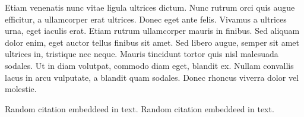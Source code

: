 Etiam venenatis nunc vitae ligula ultrices dictum. Nunc rutrum orci quis augue efficitur, a ullamcorper erat ultrices. Donec eget ante felis. Vivamus a ultrices urna, eget iaculis erat. Etiam rutrum ullamcorper mauris in finibus. Sed aliquam dolor enim, eget auctor tellus finibus sit amet. Sed libero augue, semper sit amet ultrices in, tristique nec neque. Mauris tincidunt tortor quis nisl malesuada sodales. Ut in diam volutpat, commodo diam eget, blandit ex. Nullam convallis lacus in arcu vulputate, a blandit quam sodales. Donec rhoncus viverra dolor vel molestie.

Random citation \cite{DUMMY:1} embeddeed in text.
Random citation \cite{DUMMY:2} embeddeed in text.